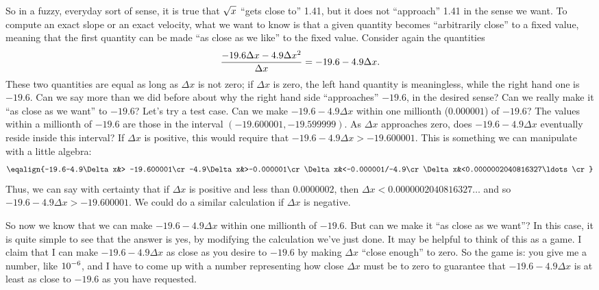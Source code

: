 So in a fuzzy,
everyday sort of sense, it is true that $\displaystyle \sqrt{x}$ ``gets close to''
1.41, but it does not ``approach'' 1.41 in the sense we want. To
compute an exact slope or an exact velocity, what we want to know is that
a given quantity becomes ``arbitrarily close'' to a fixed value,
meaning that the first quantity can be made ``as close as we like'' to
the fixed value. Consider again the quantities
$${-19.6\Delta x-4.9\Delta x^2\over \Delta x}=-19.6-4.9\Delta x.
$$
These two quantities are equal as long as $\Delta x$ is not zero; if
$\Delta x$ is zero, the left hand quantity is meaningless, while the
right hand one is $-19.6$. Can we say more than we did before about
why the right hand side ``approaches'' $-19.6$, in the desired sense?
Can we really make it ``as close as we want'' to $-19.6$? Let's try a
test case. Can we make $-19.6-4.9\Delta x$ within one millionth
($0.000001$) of $-19.6$? The values within a millionth of $-19.6$ are
those in the interval $(-19.600001,-19.599999)$. As $\Delta x$
approaches zero, does $-19.6-4.9\Delta x$ eventually reside inside
this interval? If $\Delta x$ is positive, this would require that
$-19.6-4.9\Delta x> -19.600001$. This is something we can manipulate
with a little algebra:
$$\eqalign{-19.6-4.9\Delta x&> -19.600001\cr
-4.9\Delta x&>-0.000001\cr
\Delta x&<-0.000001/-4.9\cr
\Delta x&<0.0000002040816327\ldots\cr
}$$
Thus, we can say with certainty that if $\Delta x$ is positive and
less than $0.0000002$, then $\Delta x < 0.0000002040816327\ldots$ and
so $-19.6-4.9\Delta x > -19.600001$. We could do a similar calculation
if $\Delta x$ is negative.

So now we know that we can make $-19.6-4.9\Delta x$ within one
millionth of $-19.6$. But can we make it ``as close as we want''?
In this case, it is quite simple to see that the answer is yes, by
modifying the calculation we've just done. It may be helpful to think
of this as a game. I claim that I can make $-19.6-4.9\Delta x$ as
close as you desire to $-19.6$ by making $\Delta x$ ``close enough''
to zero. So the game is: you give me a number, like $\displaystyle 10^{-6}$, and I
have to come up with a number representing how close $\Delta x$ must
be to zero to guarantee that $-19.6-4.9\Delta x$ is at least as close
to $-19.6$ as you have requested. 

